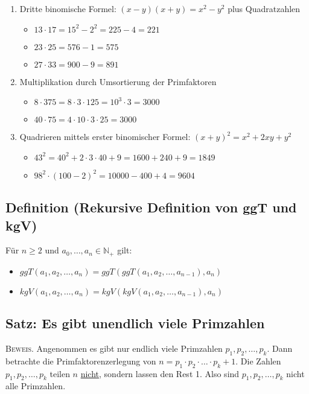 	\begin{enumerate}
	
	\item Dritte binomische Formel: $(x-y)(x+y)=x^2-y^2$ plus Quadratzahlen
		\begin{itemize}
		\item $13 \cdot 17 = 15^2 -2^2 = 225-4=221$
		\item $23 \cdot 25 = 576-1=575$
		\item $27 \cdot  33 = 900-9=891$ 
		\end{itemize}		
		
	\item Multiplikation durch Umsortierung der Primfaktoren
		\begin{itemize}
		\item $8 \cdot 375=8 \cdot 3 \cdot 125 = 10^3 \cdot 3=3000$
		\item $40 \cdot 75=4 \cdot 10 \cdot 3 \cdot 25 = 3000$
		\end{itemize}
		
	\item Quadrieren mittels erster binomischer Formel: $(x+y)^2=x^2+2xy+y^2$
		\begin{itemize}
		\item $43^2=40^2+2 \cdot 3 \cdot 40 + 9 = 1600+240+9=1849$
		\item $98^2 \cdot (100-2)^2=10000-400+4=9604$
		\end{itemize}

	\end{enumerate}


\subsection[Rekursive Definition von ggT und kgV]{Definition (Rekursive Definition von ggT und kgV)}

	Für $n\geq 2$ und $a_0,\dots,a_n \in \mathbb{N_+}$ gilt:
	\begin{itemize}
	\item $ggT(a_1,a_2,\dots , a_n)=ggT(ggT(a_1,a_2,\dots , a_{n-1}),a_n)$
	\item $kgV(a_1,a_2,\dots , a_n)=kgV(kgV(a_1,a_2,\dots , a_{n-1}),a_n)$
	\end{itemize}
	
\subsection[Unendlichkeitssatz der Primzahlen]{Satz: Es gibt unendlich viele Primzahlen}

	\textsc{Beweis.} Angenommen es gibt nur endlich viele Primzahlen $p_1,p_2,\dots,p_k$. 
	Dann betrachte die Primfaktorenzerlegung von $n=p_1 \cdot p_2 \cdot \ldots \cdot p_k +1$. 
	Die Zahlen $p_1,p_2,\dots,p_k$ teilen $n$ \underline{nicht}, sondern lassen den Rest 1. 
	Also sind $p_1,p_2,\dots,p_k$ nicht alle Primzahlen.
